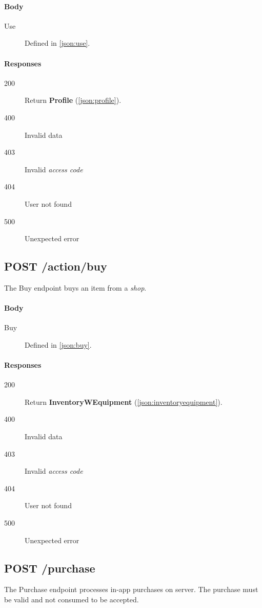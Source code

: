 		\paragraph*{Body}
			\begin{description}
				\item[Use] Defined in \ref{json:use}.
			\end{description}
		\paragraph*{Responses}
			\begin{description}		
				\item[200] Return \textbf{Profile} (\ref{json:profile}).
				\item[400] Invalid data
				\item[403] Invalid \textit{access code}
				\item[404] User not found
				\item[500] Unexpected error
			\end{description}
	
	\subsection{POST /action/buy}
	The Buy endpoint buys an item from a \textit{shop}.
		\paragraph*{Body}
			\begin{description}
				\item[Buy] Defined in \ref{json:buy}.
			\end{description}
		\paragraph*{Responses}
			\begin{description}		
				\item[200] Return \textbf{InventoryWEquipment} (\ref{json:inventoryequipment}).
				\item[400] Invalid data
				\item[403] Invalid \textit{access code}
				\item[404] User not found
				\item[500] Unexpected error
			\end{description}
	
	\subsection{POST /purchase}
	The Purchase endpoint processes in-app purchases on server. The purchase must be valid and not consumed to be accepted.
